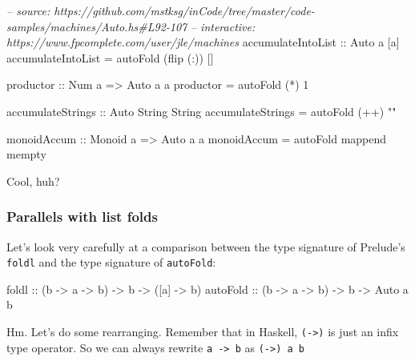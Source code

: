 \documentclass[]{article}
\newenvironment{Shaded}{}{}
\newcommand{\DataTypeTok}[1]{\textcolor[rgb]{0.56,0.13,0.00}{{#1}}}
\newcommand{\DecValTok}[1]{\textcolor[rgb]{0.25,0.63,0.44}{{#1}}}
\newcommand{\StringTok}[1]{\textcolor[rgb]{0.25,0.44,0.63}{{#1}}}
\newcommand{\CommentTok}[1]{\textcolor[rgb]{0.38,0.63,0.69}{\textit{{#1}}}}
\newcommand{\OtherTok}[1]{\textcolor[rgb]{0.00,0.44,0.13}{{#1}}}
\newcommand{\FunctionTok}[1]{\textcolor[rgb]{0.02,0.16,0.49}{{#1}}}
\newcommand{\NormalTok}[1]{{#1}}
\begin{document}
\begin{Shaded}
\begin{Highlighting}[]
\CommentTok{-- source: https://github.com/mstksg/inCode/tree/master/code-samples/machines/Auto.hs#L92-107}
\CommentTok{-- interactive: https://www.fpcomplete.com/user/jle/machines}
\OtherTok{accumulateIntoList ::} \DataTypeTok{Auto} \NormalTok{a [a]}
\NormalTok{accumulateIntoList }\FunctionTok{=} \NormalTok{autoFold (flip (}\FunctionTok{:}\NormalTok{)) []}

\OtherTok{productor ::} \DataTypeTok{Num} \NormalTok{a }\OtherTok{=>} \DataTypeTok{Auto} \NormalTok{a a}
\NormalTok{productor }\FunctionTok{=} \NormalTok{autoFold (}\FunctionTok{*}\NormalTok{) }\DecValTok{1}

\OtherTok{accumulateStrings ::} \DataTypeTok{Auto} \DataTypeTok{String} \DataTypeTok{String}
\NormalTok{accumulateStrings }\FunctionTok{=} \NormalTok{autoFold (}\FunctionTok{++}\NormalTok{) }\StringTok{""}

\OtherTok{monoidAccum ::} \DataTypeTok{Monoid} \NormalTok{a }\OtherTok{=>} \DataTypeTok{Auto} \NormalTok{a a}
\NormalTok{monoidAccum }\FunctionTok{=} \NormalTok{autoFold mappend mempty}
\end{Highlighting}
\end{Shaded}

Cool, huh?

\subsubsection{Parallels with list folds}\label{parallels-with-list-folds}

Let's look very carefully at a comparison between the type signature of
Prelude's \texttt{foldl} and the type signature of \texttt{autoFold}:

\begin{Shaded}
\begin{Highlighting}[]
\NormalTok{foldl}\OtherTok{      ::} \NormalTok{(b }\OtherTok{->} \NormalTok{a }\OtherTok{->} \NormalTok{b) }\OtherTok{->} \NormalTok{b }\OtherTok{->} \NormalTok{([a] }\OtherTok{->} \NormalTok{b)}
\OtherTok{autoFold   ::} \NormalTok{(b }\OtherTok{->} \NormalTok{a }\OtherTok{->} \NormalTok{b) }\OtherTok{->} \NormalTok{b }\OtherTok{->}  \DataTypeTok{Auto} \NormalTok{a b}
\end{Highlighting}
\end{Shaded}

Hm. Let's do some rearranging. Remember that in Haskell,
\texttt{(-\textgreater{})} is just an infix type operator. So we can always
rewrite \texttt{a\ -\textgreater{}\ b} as \texttt{(-\textgreater{})\ a\ b}
\end{document}
